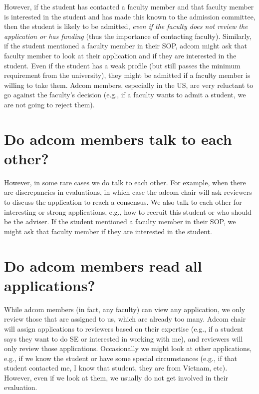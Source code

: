\documentclass[oneside,11pt,dvipsnames]{book}
\def\sectioninfo#1{%
  \addcontentsline{toc}{sectioninfo}{%
    \noexpand\numberline{}\color{black}{#1}}%
}
\begin{document}
However, if the student has contacted a faculty member and that faculty member is interested in the student and has made this known to the admission committee, then the student is likely to be admitted, \emph{even if the faculty does not review the application or has funding} (thus the importance of contacting faculty). 
Similarly, if the student mentioned a faculty member in their SOP, adcom might ask that faculty member to look at their application and if they are interested in the student.  Even if the student has a weak profile (but still passes the minimum requirement from the university), they might be admitted if a faculty member is willing to take them. Adcom members, especially in the US, are very reluctant to go against the faculty's decision (e.g., if a faculty wants to admit a student, we are not going to reject them).


\section{Do adcom members talk to each other?}\label{sec:adcom-discuss}
\sectioninfo{Sometimes adcom members discuss applicants, but in most cases they make independent decisions.}

However, in some rare cases we do talk to each other.  For example, when there are discrepancies in evaluations, in which case the adcom chair will ask reviewers to discuss the application to reach a consensus.  We also talk to each other for interesting or strong applications, e.g., how to recruit this student or who should be the adviser. 
If the student mentioned a faculty member in their SOP, we might ask that faculty member if they are interested in the student. 



\section{Do adcom members read all applications?}\label{sec:read-all}
\sectioninfo{Adcom members only review applications assigned to them (typically matching their expertise) and rarely get involved in other applications}

While adcom members (in fact, any faculty) can view any application, we only review those that are assigned to us, which are already too many. Adcom chair will assign applications to reviewers based on their expertise (e.g., if a student says they want to do SE or interested in working with me), and reviewers will only review those applications. Occasionally we might look at other applications, e.g., if we know the student or have some special circumstances (e.g., if that student contacted me, I know that student, they are from Vietnam, etc). However, even if we look at them, we usually do not get involved in their evaluation.
\end{document}
